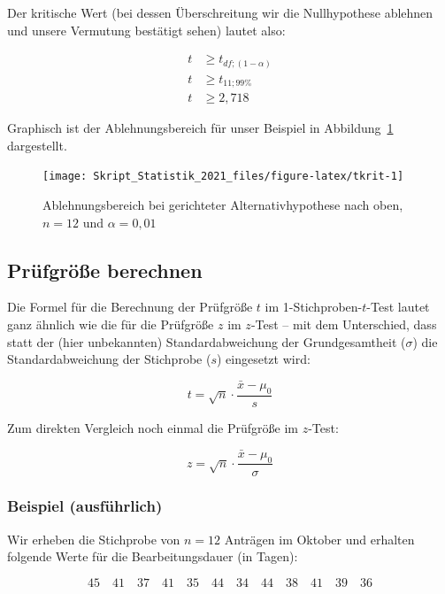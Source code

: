 \documentclass[
  11pt,
  ngerman,
  a4paper,
]{report}
\begin{document}
Der kritische Wert (bei dessen Überschreitung wir die Nullhypothese ablehnen und unsere Vermutung bestätigt sehen) lautet also:

\[
\begin{aligned}
t &\geq t_{\mathit{df};(1-\alpha)}\\[4pt]
t &\geq t_{11;99\%}\\[4pt]
t &\geq 2,718
\end{aligned}
\]

Graphisch ist der Ablehnungsbereich für unser Beispiel in Abbildung~\ref{fig:tkrit} dargestellt.

\begin{figure}[!h]

{\centering \texttt{[image: Skript\_Statistik\_2021\_files/figure-latex/tkrit-1]} 

}

\caption{Ablehnungsbereich bei gerichteter Alternativhypothese nach oben, $n=12$ und $\alpha=0{,}01$}\label{fig:tkrit}
\end{figure}

\hypertarget{pruxfcfgruxf6uxdfe-berechnen-1}{%
\subsection{Prüfgröße berechnen}\label{pruxfcfgruxf6uxdfe-berechnen-1}}

Die Formel für die Berechnung der Prüfgröße \(t\) im 1-Stichproben-\(t\)-Test lautet ganz ähnlich wie die für die Prüfgröße \(z\) im \(z\)-Test -- mit dem Unterschied, dass statt der (hier unbekannten) Standardabweichung der Grundgesamtheit (\(\sigma\)) die Standardabweichung der Stichprobe (\(s\)) eingesetzt wird:

\[
t=\sqrt{n}\cdot\frac{\bar{x}-\mu_0}{s}
\label{eq:t}
\]

Zum direkten Vergleich noch einmal die Prüfgröße im \(z\)-Test:

\[
z=\sqrt{n}\cdot\frac{\bar{x}-\mu_0}{\sigma}
\]

\hypertarget{beispiel-ausfuxfchrlich}{%
\subsubsection{Beispiel (ausführlich)}\label{beispiel-ausfuxfchrlich}}

Wir erheben die Stichprobe von \(n=12\) Anträgen im Oktober und erhalten folgende Werte für die Bearbeitungsdauer (in Tagen):

\[
45\quad41\quad37\quad41\quad35\quad44\quad34\quad44\quad38\quad41\quad39\quad36
\]
\end{document}
